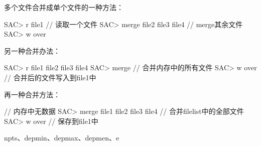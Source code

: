 多个文件合并成单个文件的一种方法：
\begin{SACCode}
SAC> r file1                        // 读取一个文件
SAC> merge file2 file3 file4        // merge其余文件
SAC> w over
\end{SACCode}

另一种合并办法：
\begin{SACCode}
SAC> r file1 file2 file3 file4
SAC> merge                      // 合并内存中的所有文件
SAC> w over                     // 合并后的文件写入到file1中
\end{SACCode}

再一种合并方法：
\begin{SACCode}                     // 内存中无数据
SAC> merge file1 file2 file3 file4  // 合并filelist中的全部文件
SAC> w over                         // 保存到file1中
\end{SACCode}

npts、depmin、depmax、depmen、e

